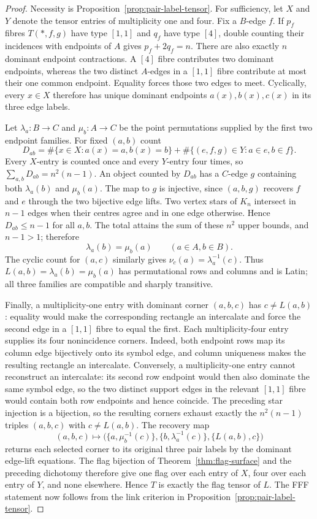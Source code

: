 \begin{proof}
Necessity is Proposition~\ref{prop:pair-label-tensor}.  For sufficiency, let
$X$ and $Y$ denote the tensor entries of multiplicity one and four.  Fix a
$B$-edge $f$.  If $p_f$ fibres $T(*,f,g)$ have type $[1,1]$ and $q_f$ have
type $[4]$, double counting their incidences with endpoints of $A$ gives
$p_f+2q_f=n$.  There are also exactly $n$ dominant endpoint contractions.
A $[4]$ fibre contributes two dominant endpoints, whereas the two distinct
$A$-edges in a $[1,1]$ fibre contribute at most their one common endpoint.
Equality forces those two edges to meet.  Cyclically, every $x\in X$ therefore
has unique dominant endpoints $a(x),b(x),c(x)$ in its three edge labels.

Let $\lambda_a:B\to C$ and $\mu_b:A\to C$ be the point permutations supplied
by the first two endpoint families.  For fixed $(a,b)$ count
\[
 D_{ab}=\#\{x\in X:a(x)=a, b(x)=b\}
 +\#\{(e,f,g)\in Y:a\in e, b\in f\}.
\]
Every $X$-entry is counted once and every $Y$-entry four times, so
$\sum_{a,b}D_{ab}=n^2(n-1)$.  An object counted by $D_{ab}$ has a $C$-edge
$g$ containing both $\lambda_a(b)$ and $\mu_b(a)$.  The map to $g$ is
injective, since $(a,b,g)$ recovers $f$ and $e$ through the two bijective
edge lifts.  Two vertex stars of $K_n$ intersect in $n-1$ edges when their
centres agree and in one edge otherwise.  Hence $D_{ab}\leq n-1$ for all
$a,b$.  The total attains the sum of these $n^2$ upper bounds, and $n-1>1$;
therefore
\[
 \lambda_a(b)=\mu_b(a)\qquad(a\in A,b\in B).
\]
The cyclic count for $(a,c)$ similarly gives
$\nu_c(a)=\lambda_a^{-1}(c)$.  Thus
$L(a,b)=\lambda_a(b)=\mu_b(a)$ has permutational rows and columns and is
Latin; all three families are compatible and sharply transitive.

Finally, a multiplicity-one entry with dominant corner $(a,b,c)$ has
$c\ne L(a,b)$: equality would make the corresponding rectangle an
intercalate and force the second edge in a $[1,1]$ fibre to equal the first.
Each multiplicity-four entry supplies its four nonincidence corners.  Indeed,
both endpoint rows map its column edge bijectively onto its symbol edge, and
column uniqueness makes the resulting rectangle an intercalate.  Conversely,
a multiplicity-one entry cannot reconstruct an intercalate: its second row
endpoint would then also dominate the same symbol edge, so the two distinct
support edges in the relevant $[1,1]$ fibre would contain both row endpoints
and hence coincide.  The preceding star injection is a bijection, so the
resulting corners exhaust exactly the $n^2(n-1)$ triples $(a,b,c)$ with
$c\ne L(a,b)$.  The recovery map
\[
 (a,b,c)\longmapsto
 \bigl(\{a,\mu_b^{-1}(c)\},\{b,\lambda_a^{-1}(c)\},
       \{L(a,b),c\}\bigr)
\]
returns each selected corner to its original three pair labels by the
dominant edge-lift equations.  The flag bijection of
Theorem~\ref{thm:flag-surface} and the preceding
dichotomy therefore give one flag over each entry of $X$, four over each
entry of $Y$, and none elsewhere.  Hence $T$ is exactly the flag tensor of
$L$.  The FFF statement now follows from the link criterion in
Proposition~\ref{prop:pair-label-tensor}.
\end{proof}


